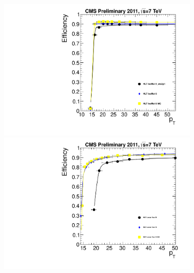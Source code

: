 \begin{figure}[ht]
\centering
\begin{minipage}[b]{0.45\linewidth}
\centering
\includegraphics[width=0.9\textwidth]{plots/MuonLegEffB.pdf}
\end{minipage}
\begin{minipage}[b]{0.45\linewidth}
\centering
\includegraphics[width=0.9\textwidth]{plots/TauLegEffMuTauB.pdf}
\end{minipage}


\end{figure}
